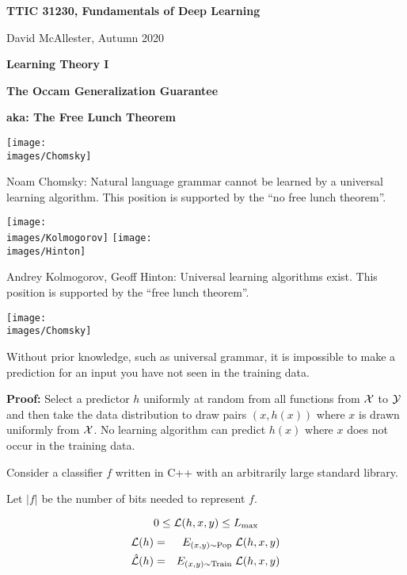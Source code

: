 




{\Huge


\centerline{\bf TTIC 31230, Fundamentals of Deep Learning}
\bigskip
\centerline{David McAllester, Autumn 2020}

\vfill
\centerline{\bf Learning Theory I}
\vfill
\centerline{\bf The Occam Generalization Guarantee}
\vfill
\centerline{\bf aka: The Free Lunch Theorem}
\vfill
\vfill


\texttt{[image: \\images/Chomsky]} \begin{minipage}[b]{8in} Noam Chomsky: 
Natural language grammar cannot be learned by a universal learning algorithm.
This position is supported by the ``no free lunch theorem''.\end{minipage}

\vfill
\texttt{[image: \\images/Kolmogorov]}
\texttt{[image: \\images/Hinton]}
\begin{minipage}[b]{7in}
Andrey Kolmogorov, Geoff Hinton: Universal learning algorithms exist. This position is supported by the ``free lunch theorem''.
\end{minipage}


\texttt{[image: \\images/Chomsky]} 

Without prior knowledge, such as universal grammar, it is impossible to make a prediction for an input you have not seen in the training data.


\vfill
{\bf Proof:} Select a predictor $h$ uniformly at random from all functions from ${\cal X}$ to ${\cal Y}$ and then take the data distribution to draw pairs $(x, h(x))$
where $x$ is drawn uniformly from ${\cal X}$.  No learning algorithm can predict $h(x)$ where $x$ does not occur in the training data.



Consider a classifier $f$ written in C++ with an arbitrarily large standard library.

\vfill
Let $|f|$ be the number of bits needed to represent $f$.


\vfill
$$0 \leq {\cal L}(h,x,y) \leq L_{\max}$$
\begin{eqnarray*}
{\cal L}(h)  & = &  E_{(x,y)\sim \mathrm{Pop}}\;{\cal L}(h,x,y) \\
\hat{{\cal L}}(h) & = & E_{(x,y)\sim \mathrm{Train}}\;{\cal L}(h,x,y)
\end{eqnarray*}

}
